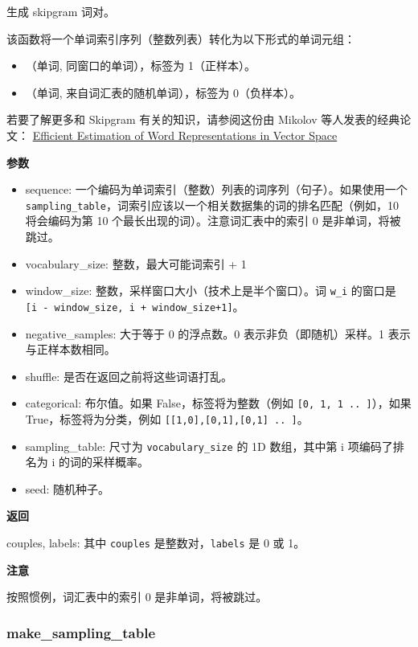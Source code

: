 生成 skipgram 词对。

该函数将一个单词索引序列（整数列表）转化为以下形式的单词元组：

\begin{itemize}
\tightlist
\item
  （单词, 同窗口的单词），标签为 1（正样本）。
\item
  （单词, 来自词汇表的随机单词），标签为 0（负样本）。
\end{itemize}

若要了解更多和 Skipgram 有关的知识，请参阅这份由 Mikolov 等人发表的经典论文：
\href{http://arxiv.org/pdf/1301.3781v3.pdf}{Efficient Estimation of Word Representations in Vector Space}

\textbf{参数}

\begin{itemize}
\tightlist
\item
  sequence: 一个编码为单词索引（整数）列表的词序列（句子）。如果使用一个
  \texttt{sampling\_table}，词索引应该以一个相关数据集的词的排名匹配（例如，10
  将会编码为第 10 个最长出现的词）。注意词汇表中的索引 0
  是非单词，将被跳过。
\item
  vocabulary\_size: 整数，最大可能词索引 + 1
\item
  window\_size: 整数，采样窗口大小（技术上是半个窗口）。词 \texttt{w\_i}
  的窗口是 \texttt{{[}i\ -\ window\_size,\ i\ +\ window\_size+1{]}}。
\item
  negative\_samples: 大于等于 0 的浮点数。0 表示非负（即随机）采样。1
  表示与正样本数相同。
\item
  shuffle: 是否在返回之前将这些词语打乱。
\item
  categorical: 布尔值。如果 False，标签将为整数（例如
  \texttt{{[}0,\ 1,\ 1\ ..\ {]}}），如果 True，标签将为分类，例如
  \texttt{{[}{[}1,0{]},{[}0,1{]},{[}0,1{]}\ ..\ {]}}。
\item
  sampling\_table: 尺寸为 \texttt{vocabulary\_size} 的 1D 数组，其中第 i
  项编码了排名为 i 的词的采样概率。
\item
  seed: 随机种子。
\end{itemize}

\textbf{返回}

couples, labels: 其中 \texttt{couples} 是整数对，\texttt{labels} 是 0 或
1。

\textbf{注意}

按照惯例，词汇表中的索引 0 是非单词，将被跳过。


\subsubsection{make\_sampling\_table}\label{make_sampling_table}

